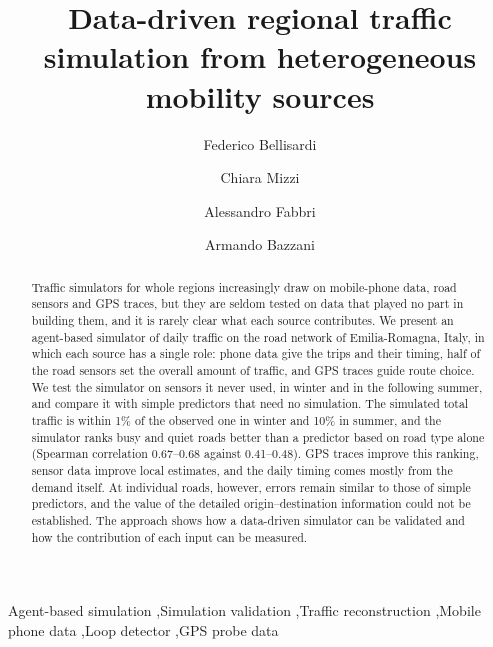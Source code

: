 \documentclass[preprint,11pt,a4paper]{elsarticle}
\begin{document}
\begin{frontmatter}

\title{Data-driven regional traffic simulation from heterogeneous mobility sources}

\author[ifisc]{Federico Bellisardi}
\author[mindicity]{Chiara Mizzi}
\author[mindicity]{Alessandro Fabbri}
\author[unibo,infn]{Armando Bazzani}


\begin{abstract}
Traffic simulators for whole regions increasingly draw on mobile-phone data, road sensors and GPS traces, but they are seldom tested on data that played no part in building them, and it is rarely clear what each source contributes. We present an agent-based simulator of daily traffic on the road network of Emilia-Romagna, Italy, in which each source has a single role: phone data give the trips and their timing, half of the road sensors set the overall amount of traffic, and GPS traces guide route choice. We test the simulator on sensors it never used, in winter and in the following summer, and compare it with simple predictors that need no simulation. The simulated total traffic is within 1\% of the observed one in winter and 10\% in summer, and the simulator ranks busy and quiet roads better than a predictor based on road type alone (Spearman correlation 0.67--0.68 against 0.41--0.48). GPS traces improve this ranking, sensor data improve local estimates, and the daily timing comes mostly from the demand itself. At individual roads, however, errors remain similar to those of simple predictors, and the value of the detailed origin--destination information could not be established. The approach shows how a data-driven simulator can be validated and how the contribution of each input can be measured.
\end{abstract}

\begin{keyword}
Agent-based simulation \sep Simulation validation \sep Traffic reconstruction \sep Mobile phone data \sep Loop detector \sep GPS probe data
\end{keyword}

\end{frontmatter}
\end{document}
